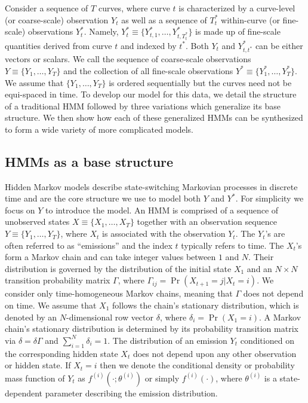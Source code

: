 
Consider a sequence of $T$ curves, where curve $t$ is characterized by a curve-level (or coarse-scale) observation $Y_t$ as well as a sequence of $T^*_t$ within-curve (or fine-scale) observations $Y^*_{t}$. Namely, $Y^*_{t} \equiv \big\{Y^*_{t,1},\ldots,Y^*_{t,T^*_t}\big\}$ is made up of fine-scale quantities derived from curve $t$ and indexed by $t^*$. Both $Y_t$ and $Y^*_{t,t^*}$ can be either vectors or scalars. We call the sequence of coarse-scale observations $Y \equiv \big\{Y_1, \ldots, Y_T\big\}$ and the collection of all fine-scale observations $Y^* \equiv \big\{Y^*_1,\ldots,Y^*_T \big\}$. We assume that $\{Y_1,\ldots,Y_T\}$ is ordered sequentially but the curves need not be equi-spaced in time. To develop our model for this data, we detail the structure of a traditional HMM followed by three variations which generalize its base structure. We then show how each of these generalized HMMs can be synthesized to form a wide variety of more complicated models.

\subsection{HMMs as a base structure}
\label{subsec:HMM}

Hidden Markov models describe state-switching Markovian processes in discrete time and are the core structure we use to model both $Y$ and $Y^*$. For simplicity we focus on $Y$ to introduce the model. An HMM is comprised of a sequence of unobserved states $X \equiv \big\{X_1, \ldots, X_T\big\}$ together with an observation sequence $Y \equiv \big\{Y_1, \ldots, Y_T\big\}$, where $X_t$ is associated with the observation $Y_t$. The $Y_t$'s are often referred to as ``emissions'' and the index $t$ typically refers to time. 
The $X_t$'s form a Markov chain and can take integer values between $1$ and $N$. Their distribution is governed by the distribution of the initial state $X_1$ and an $N \times N$ transition probability matrix $\Gamma$, where $\Gamma_{ij} = \Pr(X_{t+1} = j | X_t = i)$. We consider only time-homogeneous Markov chains, meaning that $\Gamma$ does not depend on time.
%
We assume that $X_1$ follows the chain's stationary distribution, which is denoted by an $N$-dimensional row vector $\delta$, where
$\delta_i = \Pr(X_1 = i).$
A Markov chain's stationary distribution is determined by its probability transition matrix via $\delta = \delta \Gamma$ and $\sum_{i=1}^N \delta_i = 1$.
%
The distribution of an emission $Y_t$ conditioned on the corresponding hidden state $X_t$ does not depend upon any other observation or hidden state.
%
If $X_t=i$ then we denote the conditional density or probability mass function of $Y_t$ as $f^{(i)}(\cdot ; \theta^{(i)})$ or simply $f^{(i)}(\cdot)$, where $\theta^{(i)}$ is a state-dependent parameter describing the emission distribution.
%

